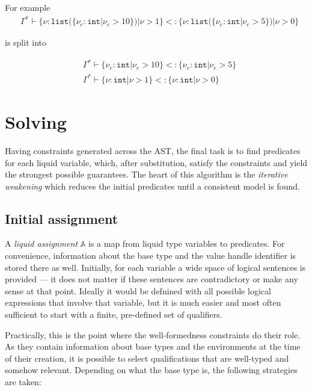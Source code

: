 For example
\begin{align*}
  & \Gamma^* \vdash \{\nu : \texttt{list}(\{\nu_e : \texttt{int} | \nu_e > 10\}) | \nu > 1\} <: \{\nu : \texttt{list}(\{\nu_e : \texttt{int} | \nu_e > 5\}) | \nu > 0\}
\end{align*}

is split into

\begin{align*}
  & \Gamma^* \vdash \{\nu_e : \texttt{int} | \nu_e > 10\} <: \{\nu_e : \texttt{int} | \nu_e > 5\}\\
  & \Gamma^* \vdash \{\nu : \texttt{int} | \nu > 1\} <: \{\nu : \texttt{int} | \nu > 0\}
\end{align*}

\section{Solving}
\label{sec:solving}

Having constraints generated across the AST, the final task is to find
predicates for each liquid variable, which, after substitution, satisfy the
constraints and yield the strongest possible guarantees. The heart of this
algorithm is the \emph{iterative weakening} which reduces the initial predicates
until a consistent model is found.

\subsection{Initial assignment}
\label{initial_assignment}

A \emph{liquid assignment} $\mathbb{A}$ is a map from liquid type variables to
predicates. For convenience, information about the base type and the value
handle identifier is stored there as well. Initially, for each variable a wide
space of logical sentences is provided --- it does not matter if these sentences
are contradictory or make any sense at that point. Ideally it would be defnined
with all possible logical expressions that involve that variable, but it is much
easier and most often sufficient to start with a finite, pre-defined set of
qualifiers.

Practically, this is the point where the well-formedness constraints do their
role. As they contain information about base types and the environments at the
time of their creation, it is possible to select qualifications that are
well-typed and somehow relevant. Depending on what the base type is, the
following strategies are taken:

